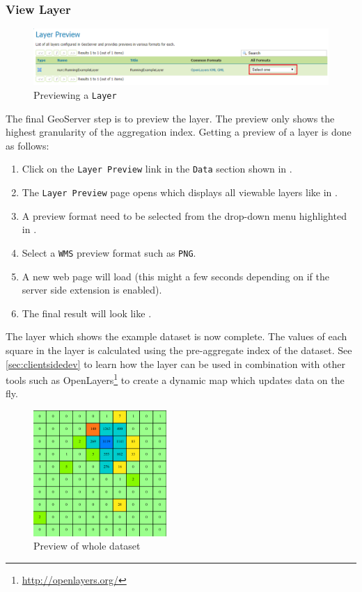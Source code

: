 \subsubsection{View Layer}
\begin{figure}[h!]
	\centering
	\vspace{-15pt}
	\includegraphics[width=\textwidth]{Figures/LayerPreview.png}
	\vspace{-25pt}
	\caption{Previewing a \lstinline|Layer|\label{fig:preview}}
\end{figure}
\noindent The final GeoServer step is to preview the layer. The preview only shows the highest granularity of the aggregation index. Getting a preview of a layer is done as follows:
\begin{enumerate}[resume]
	\item Click on the \lstinline|Layer Preview| link in the \lstinline|Data| section shown in .
	\item The \lstinline|Layer Preview| page opens which displays all viewable layers like in .
	\item A preview format need to be selected from the drop-down menu highlighted in .
	\item Select a \lstinline|WMS| preview format such as \lstinline|PNG|.
	\item A new web page will load (this might a few seconds depending on if the server side extension is enabled).
	\item The final result will look like .
\end{enumerate}
The layer which shows the example dataset is now complete. The values of each square in the layer is calculated using the pre-aggregate index of the dataset. See \ref{sec:clientsidedev} to learn how the layer can be used in combination with other tools such as OpenLayers\footnote{\url{http://openlayers.org/}} to create a dynamic map which updates data on the fly.
\begin{figure}[h!]
	\centering
	\includegraphics[width=0.45\textwidth]{Figures/FinalResult.png}
	\vspace{-5pt}
	\caption{Preview of whole dataset \label{fig:result}}
\end{figure}